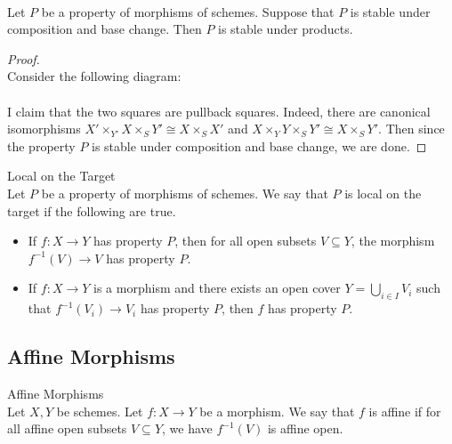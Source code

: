 \documentclass[a4paper]{article}
\begin{document}
\begin{lmm}{}{}\\
Let $P$ be a property of morphisms of schemes. Suppose that $P$ is stable under composition and base change. Then $P$ is stable under products. 
\begin{proof}\\
Consider the following diagram: \\
\\
I claim that the two squares are pullback squares. Indeed, there are canonical isomorphisms $X'\times_{Y'}X\times_SY'\cong X\times_S X'$ and $X\times_Y Y\times_SY'\cong X\times_SY'$. Then since the property $P$ is stable under composition and base change, we are done. 
\end{proof}
\end{lmm}

\begin{defn}{Local on the Target}{}\\
Let $P$ be a property of morphisms of schemes. We say that $P$ is local on the target if the following are true. 
\begin{itemize}
\item If $f:X\to Y$ has property $P$, then for all open subsets $V\subseteq Y$, the morphism $f^{-1}(V)\to V$ has property $P$. 
\item If $f:X\to Y$ is a morphism and there exists an open cover $Y=\bigcup_{i\in I}V_i$ such that $f^{-1}(V_i)\to V_i$ has property $P$, then $f$ has property $P$. 
\end{itemize}
\end{defn}

\subsection{Affine Morphisms}
\begin{defn}{Affine Morphisms}{}\\
Let $X,Y$ be schemes. Let $f:X\to Y$ be a morphism. We say that $f$ is affine if for all affine open subsets $V\subseteq Y$, we have $f^{-1}(V)$ is affine open. 
\end{defn}
\end{document}
